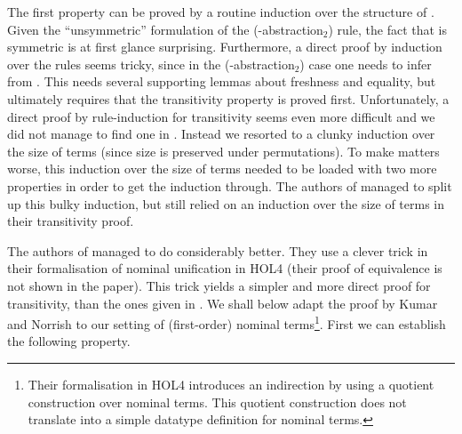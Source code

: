 \begin{isabellebody}
\begin{isamarkuptext}
  \noindent
  The first property can be proved by a routine induction over the structure of . 
  Given the ``unsymmetric'' formulation of the (-abstraction$_2$) rule, 
  the fact that  is symmetric is at first glance surprising. Furthermore, a 
  direct proof by induction over the rules seems tricky, since in 
  the (-abstraction$_2$) case one needs to infer 
   from . This needs
  several supporting lemmas about freshness and equality, but ultimately requires
  that the transitivity property is proved first. Unfortunately, 
  a direct proof by rule-induction for transitivity seems even more difficult and 
  we did not manage to find one in \cite{UrbanPittsGabbay04}. Instead we resorted 
  to a clunky induction over the 
  size of terms (since size is preserved under permutations). To make matters
  worse, this induction over the
  size of terms needed to be
  loaded with two more properties in order to get 
  the induction through. The authors of \cite{FernandezGabbay07} managed to split 
  up this bulky induction, but still relied on an induction over the size of terms
  in their transitivity proof.

  The authors of \cite{KumarNorrish10} managed to do considerably better.
  They use a clever trick in their formalisation of nominal unification in HOL4 
  (their proof of equivalence is not shown in the paper).
  This trick yields a simpler and more direct proof for transitivity, than the ones given in 
  \cite{UrbanPittsGabbay04,FernandezGabbay07}. We shall below adapt the proof 
  by Kumar and Norrish to our  setting of (first-order) nominal 
  terms\footnote{Their formalisation in HOL4 introduces an
  indirection by using a quotient construction over nominal terms. This quotient
  construction does not translate into a simple datatype definition for 
  nominal terms.}.
  First we can establish the following property. 


\end{isamarkuptext}
\end{isabellebody}
